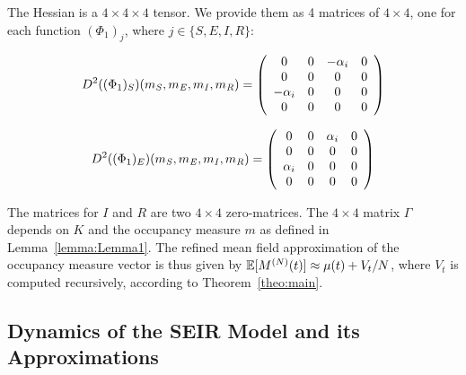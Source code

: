 \documentclass{amsart}
\begin{document}
The Hessian is a $4 \times 4 \times 4$ tensor. We provide them as 4 matrices of $4 \times 4$, one for each function $(\Phi_1)_j$, where $j \in \{S,E,I,R\}$:

$$D^2((\Phi_1)_S)(m_{\mathit{S}}, m_{\mathit{E}},m_{\mathit{I}},m_{\mathit{R}})
= \left(
    \begin{array}{cccc}
      0 &  0& -\alpha_i & 0  \\
      0 & 0 & 0 & 0 \\
      -\alpha_i & 0 & 0 & 0 \\
      0 & 0 & 0 & 0 \\
    \end{array}
  \right)$$
  
$$D^2((\Phi_1)_E)(m_{\mathit{S}}, m_{\mathit{E}},m_{\mathit{I}},m_{\mathit{R}})
= \left(
    \begin{array}{cccc}
      0 &  0& \alpha_i & 0  \\
      0 & 0 & 0 & 0 \\
      \alpha_i & 0 & 0 & 0 \\
      0 & 0 & 0 & 0 \\
    \end{array}
  \right)$$
  
The matrices for $I$ and $R$ are two $4 \times 4$ zero-matrices.
%
The $4 \times 4$ matrix $\Gamma$ depends on $K$ and the occupancy measure $m$ as defined in Lemma~\ref{lemma:Lemma1}.
%
The refined mean field approximation of the occupancy measure vector is thus given by 
$\mathbb{E}[M^{(N)}(t)] \approx \mu(t) + V_t/N$, where $V_t$ is computed recursively, according to Theorem~\ref{theo:main}.

\subsection{Dynamics of the SEIR Model and its Approximations}
\end{document}
